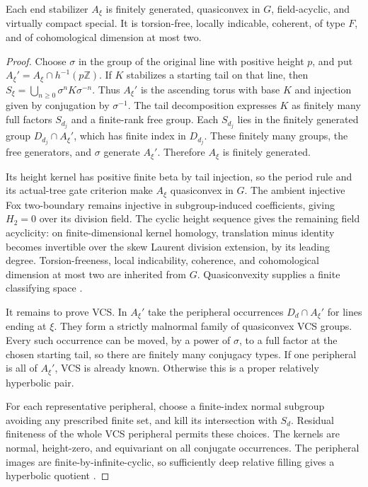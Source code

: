 \begin{proposition}\label{close:end-vcs}
Each end stabilizer $A_\xi$ is finitely generated, quasiconvex in $G$,
field-acyclic, and virtually compact special. It is torsion-free,
locally indicable, coherent, of type $F$, and of cohomological
dimension at most two.
\end{proposition}

\begin{proof}
Choose $\sigma$ in the group of the original line with positive
height $p$, and put $A_\xi'=A_\xi\cap h^{-1}(p\mathbb Z)$.
If $K$ stabilizes a starting tail on that line, then
$S_\xi=\bigcup_{n\ge0}\sigma^nK\sigma^{-n}$. Thus $A_\xi'$ is
the ascending torus with base $K$ and injection given by conjugation
by $\sigma^{-1}$. The tail decomposition expresses $K$ as finitely
many full factors $S_{d_j}$ and a finite-rank free group. Each
$S_{d_j}$ lies in the finitely generated group $D_{d_j}\cap A_\xi'$,
which has finite index in $D_{d_j}$. These finitely many groups,
the free generators, and $\sigma$ generate $A_\xi'$. Therefore
$A_\xi$ is finitely generated.

Its height kernel has positive finite beta by tail injection, so the
period rule and its actual-tree gate criterion make $A_\xi$
quasiconvex in $G$. The ambient injective Fox two-boundary remains
injective in subgroup-induced coefficients, giving $H_2=0$ over
its division field. The cyclic height sequence gives the remaining
field acyclicity: on finite-dimensional kernel homology,
translation minus identity becomes invertible over the skew Laurent
division extension, by its leading degree. Torsion-freeness, local
indicability, coherence, and cohomological dimension at most two
are inherited from $G$. Quasiconvexity supplies a finite classifying
space \cite[Theorem~5]{MeintrupSchick2002}.

It remains to prove VCS. In $A_\xi'$ take the peripheral occurrences
$D_d\cap A_\xi'$ for lines ending at $\xi$. They form a strictly
malnormal family of quasiconvex VCS groups. Every such occurrence
can be moved, by a power of $\sigma$, to a full factor at the chosen
starting tail, so there are finitely many conjugacy types. If one
peripheral is all of $A_\xi'$, VCS is already known. Otherwise this
is a proper relatively hyperbolic pair.

For each representative peripheral, choose a finite-index normal
subgroup avoiding any prescribed finite set, and kill its
intersection with $S_d$. Residual finiteness of the whole VCS
peripheral permits these choices. The kernels are normal,
height-zero, and equivariant on all conjugate occurrences. The
peripheral images are finite-by-infinite-cyclic, so sufficiently
deep relative filling gives a hyperbolic quotient
\cite{Osin2007}.


\end{proof}
